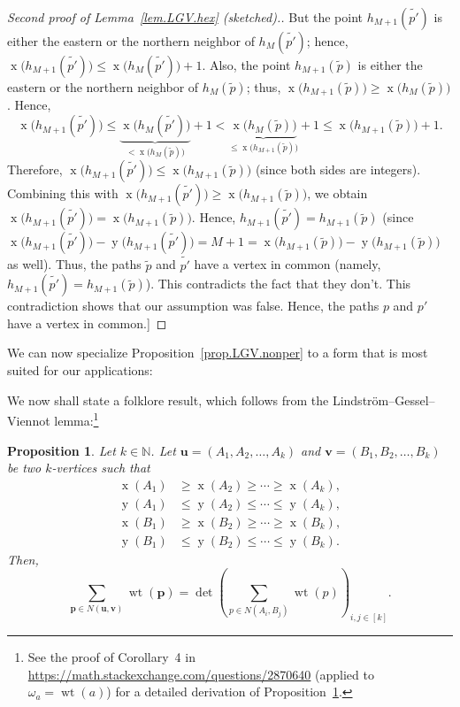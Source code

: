 \documentclass[reqno]{amsart}
\newcommand{\0}{\phantom{c}}
\DeclareMathOperator{\wt}{wt} %
\DeclareMathOperator{\xcoord}{x} %
\DeclareMathOperator{\ycoord}{y} %
\newcommand{\pp}{\mathbf{p}}
\newcommand{\uu}{\mathbf{u}}
\newcommand{\vv}{\mathbf{v}}
\newcommand{\NN}{\mathbb{N}}
\let\sumnonlimits\sum
\renewcommand{\sum}{\sumnonlimits\limits}
\newenvironment{verlong}{}{}
\newcommand{\tup}[1]{\left( #1 \right)}
\newcommand{\ive}[1]{\left[ #1 \right]}
\theoremstyle{plain}
\newtheorem{prop}[thm]{Proposition}
\theoremstyle{definition}
\numberwithin{equation}{section}
\begin{document}
\begin{verlong}
\begin{proof}[Second proof of Lemma~\ref{lem.LGV.hex} (sketched).]
But the point $h_{M+1}(\widetilde{p'})$ is either the eastern or the northern neighbor of $h_{M}(\widetilde{p'})$; hence, $\xcoord\bigl( h_{M+1}(\widetilde{p'}) \bigr) \leq \xcoord\bigl( h_{M}(\widetilde{p'}) \bigr) + 1$.
Also, the point $h_{M+1}(\widetilde{p})$ is either the eastern or the northern neighbor of $h_{M}(\widetilde{p})$; thus, $\xcoord\bigl( h_{M+1}(\widetilde{p}) \bigr) \geq \xcoord\bigl( h_{M}(\widetilde{p}) \bigr)$.
Hence,
\[
\xcoord\bigl( h_{M+1}(\widetilde{p'}) \bigr) \leq \underbrace{\xcoord\bigl( h_{M}(\widetilde{p'}) \bigr)}_{<\xcoord\bigl( h_{M}(\widetilde{p}) \bigr)} + 1 < \underbrace{\xcoord\bigl( h_{M}(\widetilde{p}) \bigr)}_{\leq\xcoord\bigl( h_{M+1}(\widetilde{p}) \bigr)} + 1 \leq \xcoord\bigl( h_{M+1}(\widetilde{p}) \bigr) + 1.
\]
Therefore, $\xcoord\bigl( h_{M+1}(\widetilde{p'}) \bigr) \leq \xcoord\bigl( h_{M+1}(\widetilde{p}) \bigr)$ (since both sides are integers).
Combining this with $\xcoord\bigl( h_{M+1}(\widetilde{p'}) \bigr) \geq \xcoord\bigl( h_{M+1}(\widetilde{p}) \bigr)$, we obtain $\xcoord\bigl( h_{M+1}(\widetilde{p'}) \bigr) = \xcoord\bigl( h_{M+1}(\widetilde{p}) \bigr)$.
Hence, $h_{M+1}(\widetilde{p'}) = h_{M+1}(\widetilde{p})$ (since $\xcoord\bigl( h_{M+1}(\widetilde{p'}) \bigr) -\ycoord\bigl( h_{M+1}(\widetilde{p'}) \bigr) = M + 1 = \xcoord\bigl( h_{M+1}(\widetilde{p}) \bigr) - \ycoord( h_{M+1}(\widetilde{p}) \bigr)$ as well).
Thus, the paths $\widetilde{p}$ and $\widetilde{p'}$ have a vertex in common (namely, $h_{M+1}(\widetilde{p'}) = h_{M+1}(\widetilde{p})$).
This contradicts the fact that they don't.
This contradiction shows that our assumption was false.
Hence, the paths $p$ and $p'$ have a vertex in common.]
\end{proof}

We can now specialize Proposition~\ref{prop.LGV.nonper} to a form that is most
suited for our applications:
\end{verlong}

We now shall state a folklore result, which follows from the Lindstr\"om--Gessel--Viennot lemma:\footnote{%
See the proof of Corollary~4 in \url{https://math.stackexchange.com/questions/2870640} (applied to $\omega_{a} = \wt(a)$) for a detailed derivation of Proposition~\ref{prop.LGV.concrete}.}

\begin{prop}
\label{prop.LGV.concrete}
Let $k \in \NN$.
Let $\uu = \tup{A_1, A_2, \dotsc, A_k}$ and $\vv = \tup{B_1,B_2, \dotsc, B_k}$ be two $k$-vertices such that
\begin{align*}
\xcoord(A_1) & \geq \xcoord(A_2) \geq \cdots \geq \xcoord(A_k), \\
\ycoord(A_1) & \leq \ycoord(A_2) \leq \cdots \leq \ycoord(A_k), \\
\xcoord(B_1) & \geq \xcoord(B_2) \geq \cdots \geq \xcoord(B_k), \\
\ycoord(B_1) & \leq \ycoord(B_2) \leq \cdots \leq \ycoord(B_k).
\end{align*}
Then,
\[
\sum_{\pp \in N(\uu,\vv)} \wt(\pp) = \det\left( \sum_{p\in N(A_i,B_j) } \wt(p) \right)_{i, j \in \ive{k}} .
\]
\end{prop}
\end{document}
